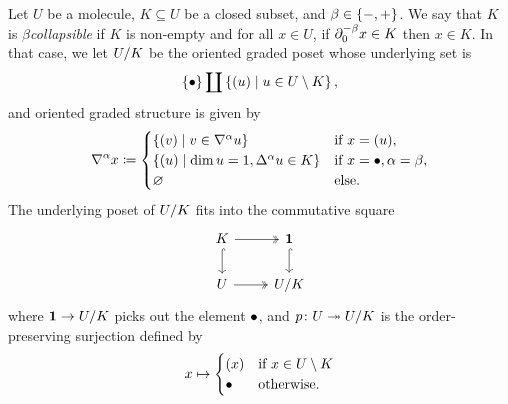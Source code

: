 \begin{dfn}  \label{dfn:collapsible}
    Let \( U \) be a molecule, \( K \subseteq U \) be a closed subset, and \( \beta \in \set{-, +} \).
    We say that \( K \) is \emph{\( \beta \)\nbd collapsible} if \( K \) is non-empty and for all \( x \in U \), if \( \bd{0}{-\beta} x \in K \) then \( x \in K \).
    In that case, we let \( \coll K U \) be the oriented graded poset whose underlying set is
    \begin{equation*}
        \set{\zcoll} \coprod \set{\icoll u \mid u \in U \setminus K},
    \end{equation*}
    and oriented graded structure is given by
    \begin{equation*}
        \cofaces{}{\a} x \eqdef
        \begin{cases}
            \set{ \icoll v \mid v \in \cofaces{}{\a} u} & \text{if } x = \icoll u,\\
            \set{ \icoll u \mid \dim u = 1, \faces{}{\a} u \in K} &\text{if } x = \bullet, \a = \beta,\\
            \varnothing &\text{else.}
        \end{cases}
    \end{equation*}
    The underlying poset of \( \coll{K}{U} \) fits into the commutative square
    \begin{equation} \label{tik:square_collapse}
        \begin{tikzcd} 
            K & \pt \\
            U & {\coll K U}
            \arrow[""{name=0, anchor=center, inner sep=0}, two heads, from=1-1, to=1-2]
            \arrow[hook, from=1-1, to=2-1]
            \arrow[hook, from=1-2, to=2-2]
            \arrow[two heads, from=2-1, to=2-2]
        \end{tikzcd}
    \end{equation}
    where \( \pt \to \coll{K}{U} \) picks out the element \( \zcoll \), and \( \mapcoll \colon U \surj \coll{K}{U} \) is the order-preserving surjection defined by
    \begin{equation*}
        x \mapsto
        \begin{cases}
            \icoll x & \text{if } x \in U \setminus K\\
            \zcoll & \text{otherwise.}
        \end{cases}
    \end{equation*}
\end{dfn}

